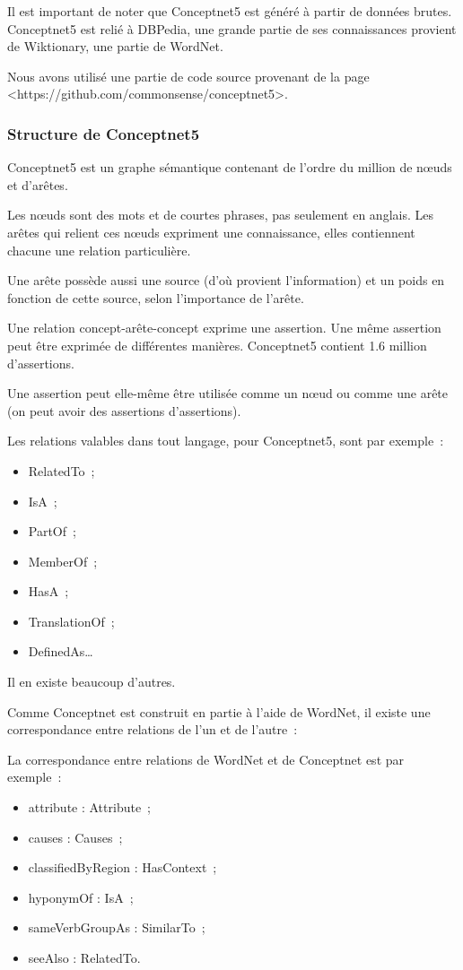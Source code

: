 \documentclass[a4paper, 12pt]{article}
\begin{document}
Il est important de noter que Conceptnet5 est généré à partir de données brutes. Conceptnet5 est relié à DBPedia, une grande partie de ses connaissances provient de Wiktionary, une partie de WordNet.

Nous avons utilisé une partie de code source provenant de la page <https://github.com/commonsense/conceptnet5>.


\subsubsection{Structure de Conceptnet5}

Conceptnet5 est un graphe sémantique contenant de l'ordre du million de nœuds et d'ar\^etes.

Les n\oe{}uds sont des mots et de courtes phrases, pas seulement en anglais. Les arêtes qui relient ces n\oe{}uds expriment une connaissance, elles contiennent chacune une relation particulière.

Une arête possède aussi une source (d'où provient l'information) et un poids en fonction de cette source, selon l'importance de l'arête.

Une relation concept-arête-concept exprime une assertion. Une même assertion peut être exprimée de différentes manières. Conceptnet5 contient 1.6 million d'assertions.

Une assertion peut elle-même être utilisée comme un n\oe{}ud ou comme une arête (on peut avoir des assertions d'assertions).

Les relations valables dans tout langage, pour Conceptnet5, sont par exemple~: 
\begin{itemize}
 \item RelatedTo~;
 \item IsA~;
 \item PartOf~;
 \item MemberOf~;
 \item HasA~;
 \item TranslationOf~;
 \item DefinedAs\ldots{}
\end{itemize}

Il en existe beaucoup d'autres.

Comme Conceptnet est construit en partie à l'aide de WordNet, il existe une correspondance entre relations de l'un et de l'autre~:

La correspondance entre relations de WordNet et de Conceptnet est par exemple~:
\begin{itemize}
 \item attribute : Attribute~;
 \item causes : Causes~;
 \item classifiedByRegion : HasContext~;
 \item hyponymOf : IsA~;
 \item sameVerbGroupAs : SimilarTo~;
 \item seeAlso : RelatedTo.
\end{itemize}
\end{document}

